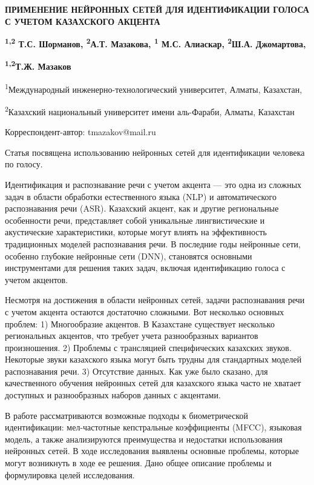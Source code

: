 
{\bfseries ПРИМЕНЕНИЕ НЕЙРОННЫХ СЕТЕЙ ДЛЯ ИДЕНТИФИКАЦИИ ГОЛОСА С УЧЕТОМ
КАЗАХСКОГО АКЦЕНТА}

{\bfseries \textsuperscript{1,2} Т.С. Шорманов, \textsuperscript{2}А.Т.
Мазакова, \textsuperscript{1} М.С. Алиаскар, \textsuperscript{2}Ш.А.
Джомартова,}

{\bfseries \textsuperscript{1,2}Т.Ж. Мазаков\textsuperscript{\envelope }}

\textsuperscript{1}Международный инженерно-технологический университет,
Алматы, Казахстан,

\textsuperscript{2}Казахский национальный университет имени аль-Фараби,
Алматы, Казахстан

{\bfseries \textsuperscript{\envelope }}Корреспондент-автор: tmazakov@mail.ru

Статья посвящена использованию нейронных сетей для идентификации
человека по голосу.

Идентификация и распознавание речи с учетом акцента --- это одна из
сложных задач в области обработки естественного языка (NLP) и
автоматического распознавания речи (ASR). Казахский акцент, как и другие
региональные особенности речи, представляет собой уникальные
лингвистические и акустические характеристики, которые могут влиять на
эффективность традиционных моделей распознавания речи. В последние годы
нейронные сети, особенно глубокие нейронные сети (DNN), становятся
основными инструментами для решения таких задач, включая идентификацию
голоса с учетом акцентов.

Несмотря на достижения в области нейронных сетей, задачи распознавания
речи с учетом акцента остаются достаточно сложными. Вот несколько
основных проблем: 1) Многообразие акцентов. В Казахстане существует
несколько региональных акцентов, что требует учета разнообразных
вариантов произношения. 2) Проблемы с трансляцией специфических
казахских звуков. Некоторые звуки казахского языка могут быть трудны для
стандартных моделей распознавания речи. 3) Отсутствие данных. Как уже
было сказано, для качественного обучения нейронных сетей для казахского
языка часто не хватает доступных и разнообразных наборов данных с
акцентами.

В работе рассматриваются возможные подходы к биометрической
идентификации: мел-частотные кепстральные коэффициенты (MFCC), языковая
модель, а также анализируются преимущества и недостатки использования
нейронных сетей. В ходе исследования выявлены основные проблемы, которые
могут возникнуть в ходе ее решения. Дано общее описание проблемы и
формулировка целей исследования.

